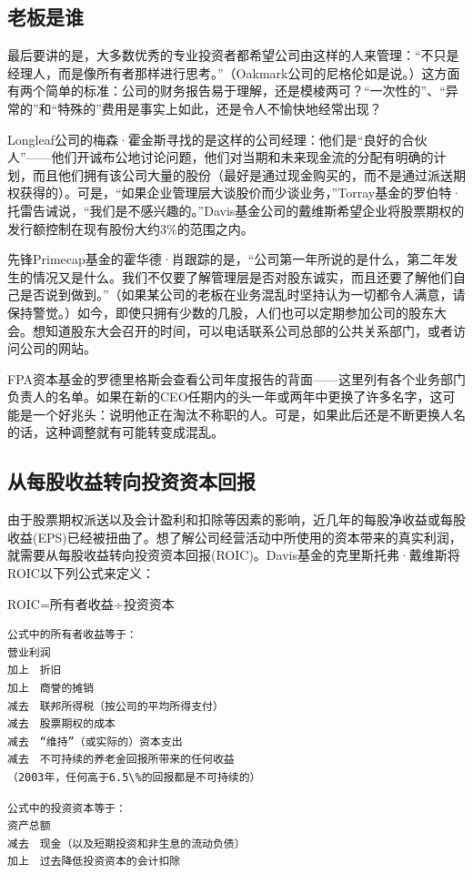 \documentclass[12pt,oneside]{book}
\begin{document}
\subsection{老板是谁}
最后要讲的是，大多数优秀的专业投资者都希望公司由这样的人来管理：“不只是经理人，而是像所有者那样进行思考。”（Oakmark公司的尼格伦如是说。）这方面有两个简单的标准：公司的财务报告易于理解，还是模棱两可？“一次性的”、“异常的”和“特殊的”费用是事实上如此，还是令人不愉快地经常出现？

Longleaf公司的梅森·霍金斯寻找的是这样的公司经理：他们是“良好的合伙人”——他们开诚布公地讨论问题，他们对当期和未来现金流的分配有明确的计划，而且他们拥有该公司大量的股份（最好是通过现金购买的，而不是通过派送期权获得的）。可是，“如果企业管理层大谈股价而少谈业务，”Torray基金的罗伯特·托雷告诫说，“我们是不感兴趣的。”Davis基金公司的戴维斯希望企业将股票期权的发行额控制在现有股份大约3\%的范围之内。

先锋Primecap基金的霍华德·肖跟踪的是，“公司第一年所说的是什么，第二年发生的情况又是什么。我们不仅要了解管理层是否对股东诚实，而且还要了解他们自己是否说到做到。”（如果某公司的老板在业务混乱时坚持认为一切都令人满意，请保持警觉。）如今，即使只拥有少数的几股，人们也可以定期参加公司的股东大会。想知道股东大会召开的时间，可以电话联系公司总部的公共关系部门，或者访问公司的网站。

FPA资本基金的罗德里格斯会查看公司年度报告的背面——这里列有各个业务部门负责人的名单。如果在新的CEO任期内的头一年或两年中更换了许多名字，这可能是一个好兆头：说明他正在淘汰不称职的人。可是，如果此后还是不断更换人名的话，这种调整就有可能转变成混乱。


\subsection{从每股收益转向投资资本回报}
由于股票期权派送以及会计盈利和扣除等因素的影响，近几年的每股净收益或每股收益(EPS)已经被扭曲了。想了解公司经营活动中所使用的资本带来的真实利润，就需要从每股收益转向投资资本回报(ROIC)。Davis基金的克里斯托弗·戴维斯将ROIC以下列公式来定义：

ROIC=所有者收益÷投资资本

\begin{verbatim}
公式中的所有者收益等于：
营业利润
加上　折旧
加上　商誉的摊销
减去　联邦所得税（按公司的平均所得支付）
减去　股票期权的成本
减去　“维持”（或实际的）资本支出
减去　不可持续的养老金回报所带来的任何收益
（2003年，任何高于6.5\%的回报都是不可持续的）
\end{verbatim}


\begin{verbatim}
公式中的投资资本等于：
资产总额
减去　现金（以及短期投资和非生息的流动负债）
加上　过去降低投资资本的会计扣除
\end{verbatim}
\end{document}
